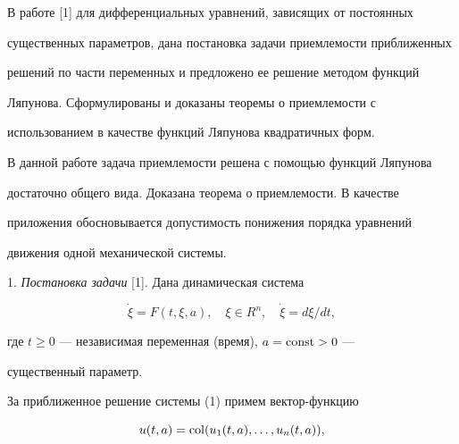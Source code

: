  




\maketitle 


\label{begin} 


 


 


В работе [1] для дифференциальных уравнений, зависящих от постоянных  


существенных параметров, дана постановка задачи приемлемости приближенных  


решений по части переменных и предложено ее решение методом функций  


Ляпунова. Сформулированы и доказаны теоремы о приемлемости с 


использованием в качестве функций Ляпунова квадратичных форм.


 


В данной работе задача приемлемости решена с помощью функций Ляпунова 


достаточно общего вида. Доказана теорема о приемлемости. В качестве  


приложения обосновывается допустимость понижения порядка уравнений  


движения одной механической системы. 


\medskip 


 


1. {\it Постановка задачи} [1]. Дана динамическая система 


\begin{equation} 


\Dot\xi=F(t,\xi,a),\quad \xi\in R^n,\quad 


\Dot\xi=d\xi/dt, 


\end{equation} 


где $t\ge 0$ --- независимая переменная (время), $a=\operatorname{const}>0$ --- 


существенный параметр. 


За приближенное решение системы (1) примем вектор-функцию 


\begin{equation} 


u(t,a)=\col(u_1(t,a),\dotsc,u_n(t,a)), 


\end{equation} 



